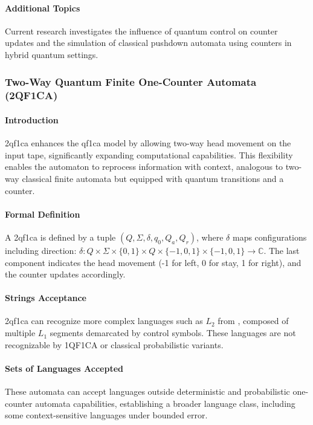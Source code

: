 \paragraph{Additional Topics} 
Current research investigates the influence of quantum control on counter updates and the simulation of classical pushdown automata using counters in hybrid quantum settings.


\subsubsection{Two-Way Quantum Finite One-Counter Automata (2QF1CA)}

\paragraph{Introduction}
\gls{2qf1ca} enhances the \gls{qf1ca} model by allowing two-way head movement on the input tape, significantly expanding computational capabilities. This flexibility enables the automaton to reprocess information with context, analogous to two-way classical finite automata but equipped with quantum transitions and a counter.

\paragraph{Formal Definition}
A \gls{2qf1ca} is defined by a tuple $(Q, \Sigma, \delta, q_0, Q_a, Q_r)$, where $\delta$ maps configurations including direction: $\delta: Q \times \Sigma \times \{0,1\} \times Q \times \{-1,0,1\} \times \{-1,0,1\} \rightarrow \mathbb{C}$. The last component indicates the head movement (-1 for left, 0 for stay, 1 for right), and the counter updates accordingly.

\paragraph{Strings Acceptance}
\gls{2qf1ca} can recognize more complex languages such as $L_2$ from \cite{bonner2001quantum}, composed of multiple $L_1$ segments demarcated by control symbols. These languages are not recognizable by 1QF1CA or classical probabilistic variants.

\paragraph{Sets of Languages Accepted}
These automata can accept languages outside deterministic and probabilistic one-counter automata capabilities, establishing a broader language class, including some context-sensitive languages under bounded error.

